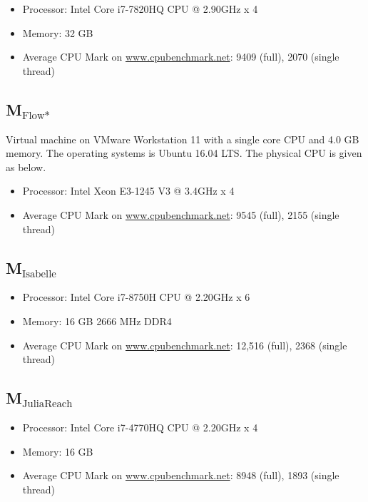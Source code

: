 \documentclass[EPiC]{easychair}
\begin{document}
\begin{itemize}
    \item Processor: Intel Core i7-7820HQ CPU @ 2.90GHz x 4 
    \item Memory: 32 GB
    \item Average CPU Mark on \url{www.cpubenchmark.net}: 9409 (full), 2070 (single thread)
\end{itemize}

\subsection{\texorpdfstring{M$_{\text{Flow*}}$}{M-Flow*}} \label{sec:machine:flowstar}
Virtual machine on VMware Workstation 11 with a single core CPU and 4.0 GB memory. The operating systems is Ubuntu 16.04 LTS. The physical CPU is given as below.
\begin{itemize}
 \item Processor: Intel Xeon E3-1245 V3 @ 3.4GHz x 4
 \item Average CPU Mark on \url{www.cpubenchmark.net}: 9545 (full), 2155 (single thread)
\end{itemize}

\subsection{\texorpdfstring{M$_{\text{Isabelle}}$}{M-Isabelle}} \label{sec:machine:isabelle}
\begin{itemize}
 \item Processor: Intel Core i7-8750H CPU @ 2.20GHz x 6
 \item Memory: 16 GB 2666 MHz DDR4
 \item Average CPU Mark on \url{www.cpubenchmark.net}: 12,516 (full), 2368 (single thread)
\end{itemize}

\subsection{\texorpdfstring{M$_{\text{JuliaReach}}$}{M-JuliaReach}} \label{sec:machine:juliareach}
\begin{itemize}
 \item Processor: Intel Core i7-4770HQ CPU @ 2.20GHz x 4
 \item Memory: 16 GB
 \item Average CPU Mark on \url{www.cpubenchmark.net}: 8948 (full), 1893 (single thread)
\end{itemize}
\end{document}
